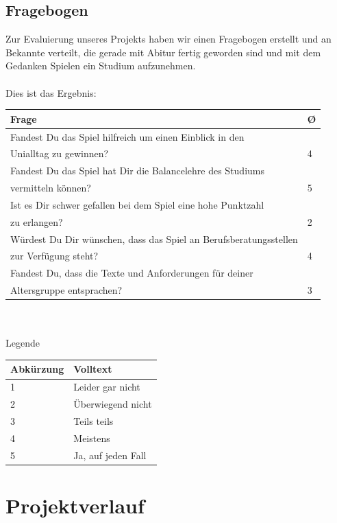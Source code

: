\documentclass[a4paper, 11pt]{article} %
\begin{document}
\subsection{Fragebogen}
Zur Evaluierung unseres Projekts haben wir einen Fragebogen erstellt und an Bekannte verteilt, die gerade mit Abitur fertig geworden sind und mit dem Gedanken Spielen ein Studium aufzunehmen. \\\\
Dies ist das Ergebnis: \\
\begin{tabular}{|lp{0.19cm}|}
\hline 
\textbf{Frage} & \textbf{\O} \\
\hline 
Fandest Du das Spiel hilfreich um einen Einblick in den & \\
Unialltag zu gewinnen? & 4 \\
Fandest Du das Spiel hat Dir die Balancelehre des Studiums & \\
vermitteln können? & 5 \\
Ist es Dir schwer gefallen bei dem Spiel eine hohe Punktzahl & \\
zu erlangen? & 2 \\
Würdest Du Dir wünschen, dass das Spiel an Berufsberatungsstellen & \\
zur Verfügung steht? & 4 \\
Fandest Du, dass die Texte und Anforderungen für deiner & \\
 Altersgruppe entsprachen? & 3 \\
\hline
\end{tabular} \\\\
Legende \\
\begin{tabular}{|lp{3cm}|}
\hline 
\textbf{Abkürzung} & \textbf{Volltext} \\
\hline 
1 & Leider gar nicht \\
2 & Überwiegend nicht \\
3 & Teils teils \\
4 & Meistens \\
5 & Ja, auf jeden Fall \\
\hline
\end{tabular}

\section{Projektverlauf}
\end{document}
